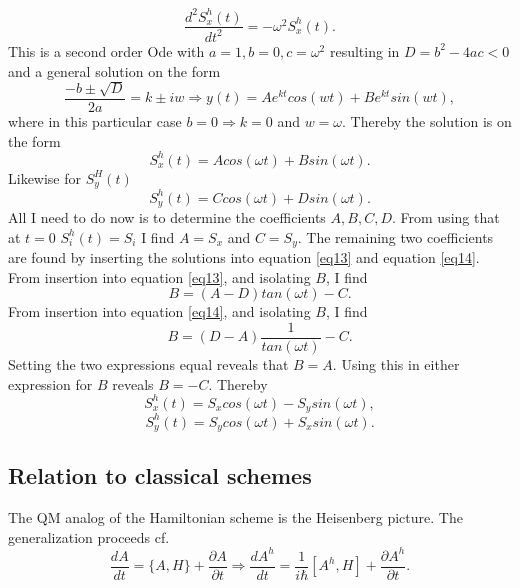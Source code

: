 \begin{example}
\begin{equation}
		\frac{d^2 S_x^h(t)}{dt^2}=-\omega^2S_x^h(t).
	\end{equation} 
	This is a second order Ode with $a=1,b=0,c=\omega^2$ resulting in $D=b^2-4ac<0$ and a general solution on the form
	\begin{equation}
		\frac{-b\pm\sqrt{D}}{2a}=k\pm iw\Rightarrow y(t)=Ae^{kt}cos(w t)+Be^{kt}sin(w t),
	\end{equation} 
	where in this particular case $b=0\Rightarrow k=0$ and $w=\omega$. Thereby the solution is on the form
	\begin{equation}
		S_x^h(t)=Acos(\omega t)+Bsin(\omega t).
	\end{equation} 	
	Likewise for $S_y^H(t)$
	\begin{equation}
		S_y^h(t)=Ccos(\omega t)+Dsin(\omega t).
	\end{equation} 
	All I need to do now is to determine the coefficients $A,B,C,D$. From using that at $t=0$ $S_i^h(t)=S_i$ I find $A=S_x$ and $C=S_y$. The remaining two coefficients are found by inserting the solutions into equation \eqref{eq13} and equation \eqref{eq14}. From insertion into equation \eqref{eq13}, and isolating $B$, I find
	\begin{equation}
		B=(A-D)tan(\omega t)-C.
	\end{equation} 
	From insertion into equation \eqref{eq14}, and isolating $B$, I find
	\begin{equation}
		B=(D-A)\frac{1}{tan(\omega t)}-C.
	\end{equation} 
	Setting the two expressions equal reveals that $B=A$. Using this in either expression for $B$ reveals $B=-C$. Thereby
	\begin{equation}
		S_x^h(t)=S_xcos(\omega t)-S_ysin(\omega t),
	\end{equation} 
	\begin{equation}
		S_y^h(t)=S_ycos(\omega t)+S_xsin(\omega t).
	\end{equation} 
\end{example}

\subsection*{Relation to classical schemes}
The QM analog of the Hamiltonian scheme is the Heisenberg picture. The generalization proceeds cf.
\begin{equation}
	\frac{dA}{dt}=\{A,H\}+\frac{\partial A}{\partial t} \Rightarrow \frac{dA^h}{dt}=\frac{1}{i\hbar}[A^h,H]+\frac{\partial A^h}{\partial t}.
\end{equation} 


